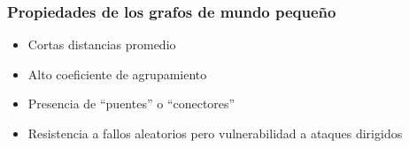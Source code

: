 \documentclass[
10pt, %
aspectratio=169, %
]{beamer}
\begin{document}
	\begin{frame}
		
		\frametitle{Propiedades de los grafos de mundo pequeño}
		
		\begin{itemize}
			
			\item Cortas distancias promedio \\[2mm]
			
			\item Alto coeficiente de agrupamiento \\[2mm]
			
			\item Presencia de ``puentes'' o ``conectores'' \\[2mm]
			
			\item Resistencia a fallos aleatorios pero vulnerabilidad a ataques dirigidos \\[2mm]
		\end{itemize}
	
	\end{frame}
	
\end{document}
